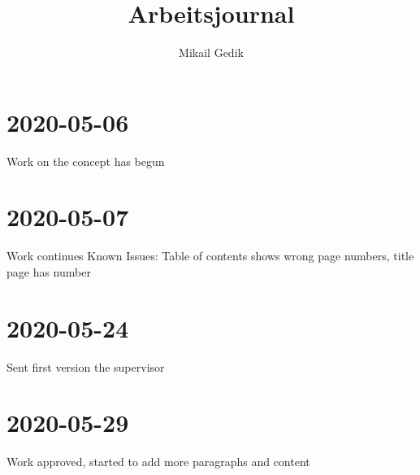 \documentclass[10pt,a4paper]{article}
\author{Mikail Gedik}
\title{Arbeitsjournal}
\begin{document}
	 \maketitle
	 \section{2020-05-06}
	 Work on the concept has begun
	\section{2020-05-07}
	Work continues\newline
	Known Issues: Table of contents shows wrong page numbers, title page has number
	\section{2020-05-24}
	Sent first version the supervisor
	\section{2020-05-29}
	Work approved, started to add more paragraphs and content
\end{document}
